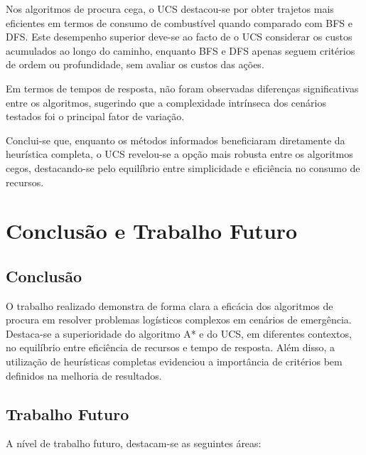 \documentclass[a4paper,12pt]{scrreprt}
\begin{document}
Nos algoritmos de procura cega, o UCS destacou-se por obter trajetos mais eficientes em termos de consumo de combustível quando comparado com BFS e DFS. Este desempenho superior deve-se ao facto de o UCS considerar os custos acumulados ao longo do caminho, enquanto BFS e DFS apenas seguem critérios de ordem ou profundidade, sem avaliar os custos das ações.

Em termos de tempos de resposta, não foram observadas diferenças significativas entre os algoritmos, sugerindo que a complexidade intrínseca dos cenários testados foi o principal fator de variação.

Conclui-se que, enquanto os métodos informados beneficiaram diretamente da heurística completa, o UCS revelou-se a opção mais robusta entre os algoritmos cegos, destacando-se pelo equilíbrio entre simplicidade e eficiência no consumo de recursos.


\chapter{Conclusão e Trabalho Futuro}

\section{Conclusão}

O trabalho realizado demonstra de forma clara a eficácia dos algoritmos de procura em resolver problemas logísticos complexos
em cenários de emergência. Destaca-se a superioridade do algoritmo A* e do UCS, em diferentes contextos, no equilíbrio entre eficiência
de recursos e tempo de resposta. Além disso, a utilização de heurísticas completas evidenciou a importância de critérios bem definidos
na melhoria de resultados. 

\section{Trabalho Futuro}
A nível de trabalho futuro, destacam-se as seguintes áreas:
\end{document}
